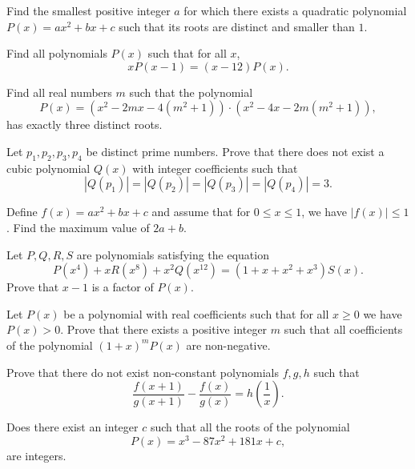 \documentclass[12pt,a4paper]{memoir}
\theoremstyle{definition}
\begin{document}
\begin{question}[name={1969 USSR}]
	Find the smallest positive integer $a$ for which there exists a quadratic polynomial $P(x)=ax^2+bx+c$ such that its roots are distinct and smaller than $1$.
\end{question}

\begin{question}[name={1987 Iran}]
	Find all polynomials $P(x)$ such that for all $x$, \[xP(x-1)=(x-12)P(x).\]
\end{question}

\begin{question}[name={1997 Bulgaria}]
	Find all real numbers $m$ such that the polynomial
	\[P(x)=(x^2-2mx-4(m^2+1))\cdot (x^2-4x-2m(m^2+1)),\]
	has exactly three distinct roots.
\end{question}


\begin{question}[name={1997 Austrian--Polish}]
	Let $p_1,p_2,p_3,p_4$ be distinct prime numbers. Prove that there does not exist a cubic polynomial $Q(x)$ with integer coefficients such that
	\[|Q(p_1)|=|Q(p_2)|=|Q(p_3)|=|Q(p_4)|=3.\]
\end{question}


\begin{question}[name={1996 Iran}]
	Define $f(x)=ax^2+bx+c$ and assume that for $0\leq x \leq 1$, we have $|f(x)|\leq 1$. Find the maximum value of $2a+b$.
\end{question}

\begin{question}
	Let $P,Q,R,S$ are polynomials satisfying the equation
	\[P(x^4)+xR(x^8) + x^2Q(x^{12}) = (1+x+x^2+x^3)S(x).\]
	Prove that $x-1$ is a factor of $P(x)$.
\end{question}


\begin{question}[name={1998 Iran}]
	Let $P(x)$ be a polynomial with real coefficients such that for all $x\geq 0$ we have $P(x) > 0$. Prove that there exists a positive integer $m$ such that all coefficients of the polynomial $(1+x)^mP(x)$ are non-negative.
\end{question}

\begin{question}
	Prove that there do not exist non-constant polynomials $f,g,h$ such that
	\[\frac{f(x+1)}{g(x+1)}-\frac{f(x)}{g(x)} = h\left(\frac{1}{x}\right).\]
\end{question}


\begin{question}
	Does there exist an integer $c$ such that all the roots of the polynomial \[P(x)=x^3-87x^2+181x+c,\] are integers.
\end{question}
\end{document}
